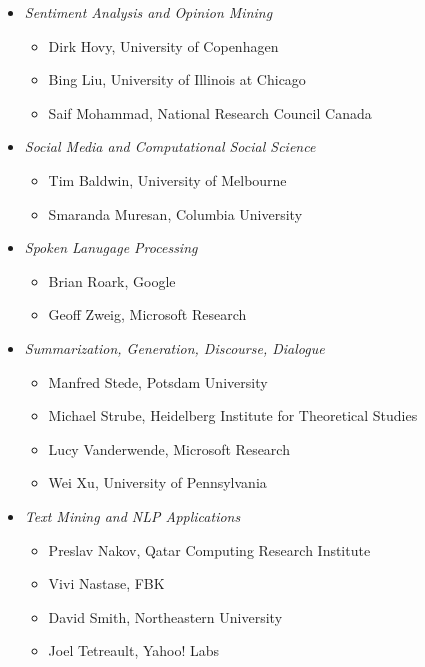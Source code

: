 \begin{itemize}[itemsep=7pt, leftmargin=0cm, label={}]
\begin{itemize}[leftmargin=0.5cm, itemsep=6pt, label={}]
\item \emph{Sentiment Analysis and Opinion Mining}

\begin{itemize}[nosep, leftmargin=0.5cm, label={}]
\item Dirk Hovy, University of Copenhagen 
\item   Bing Liu, University of Illinois at Chicago  
\item    Saif Mohammad, National Research Council Canada 
\end{itemize}

\item \emph{Social Media and Computational Social Science}

\begin{itemize}[nosep, leftmargin=0.5cm, label={}]
\item Tim Baldwin, University of Melbourne 
\item    Smaranda Muresan,  Columbia University 
\end{itemize}

\item \emph{Spoken Lanugage Processing}

\begin{itemize}[nosep, leftmargin=0.5cm, label={}]
\item Brian Roark, Google 
\item    Geoff Zweig, Microsoft Research 
\end{itemize}

\item \emph{Summarization, Generation, Discourse, Dialogue}

\begin{itemize}[nosep, leftmargin=0.5cm, label={}]
\item Manfred Stede, Potsdam University 
\item    Michael Strube, Heidelberg Institute for Theoretical Studies 
\item    Lucy Vanderwende, Microsoft Research 
\item    Wei Xu, University of Pennsylvania 
\end{itemize}

\item \emph{Text Mining and NLP Applications}

\begin{itemize}[nosep, leftmargin=0.5cm, label={}]
\item  Preslav Nakov, Qatar Computing Research Institute  
\item    Vivi Nastase, FBK  
\item    David Smith, Northeastern University  
\item    Joel Tetreault, Yahoo! Labs 
\end{itemize}




\end{itemize}
\end{itemize}
